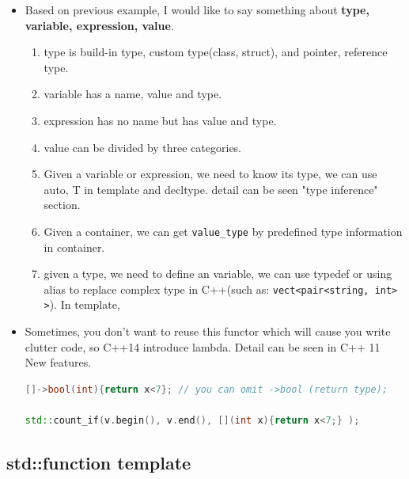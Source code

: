 \documentclass[a4paper,11pt,twoside]{book}
\begin{document}
\begin{itemize}
\begin{enumerate}
\end{enumerate}

\item Based on previous example, I would like to say something about \textbf{type, variable, expression, value}.
\begin{enumerate}
	\item type is build-in type, custom type(class, struct), and pointer, reference type.
	\item variable has a name, value and type.
	\item expression has no name but has value and type.
	\item value can be divided by three categories.
	\item Given a variable or expression, we need to know its type, we can use auto, T in template and decltype. detail can be seen "type inference" section.
	
	\item Given a container, we can get \texttt{value\_type} by predefined type information in container.
	
	\item given a type, we need to define an variable, we can use typedef or using alias to replace complex type in C++(such as: \texttt{vect<pair<string, int> >}). In template,

\end{enumerate}

	\item Sometimes, you don't want to reuse this functor which will cause you write clutter code, so C++14 introduce lambda.  Detail can be seen in C++ 11 New features.
\begin{lstlisting}[frame=single, language=c++]
 []->bool(int){return x<7}; // you can omit ->bool (return type);

std::count_if(v.begin(), v.end(), [](int x){return x<7;} );
\end{lstlisting}

\end{itemize}

\subsection{std::function template}
\end{document}
